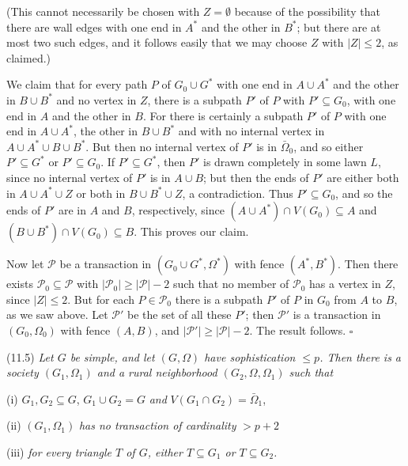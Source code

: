 \noindent (This cannot necessarily be chosen with $Z = \emptyset$ because of the possibility that there are wall edges with one end in $A^*$ and the other in $B^*$; but there are at most two such edges, and it follows easily that we may choose $Z$ with $|Z| \le 2$, as claimed.)

We claim that for every path $P$ of $G_0 \cup G^*$ with one end in $A \cup A^*$ and the other in $B \cup B^*$ and no vertex in $Z$, there is a subpath $P'$ of $P$ with $P' \subseteq G_0$, with one end in $A$ and the other in $B$. For there is certainly a subpath $P'$ of $P$ with one end in $A \cup A^*$, the other in $B \cup B^*$ and with no internal vertex in $A \cup A^* \cup B \cup B^*$. But then no internal vertex of $P'$ is in $\bar{\Omega}_0$, and so either $P' \subseteq G^*$ or $P' \subseteq G_0$. If $P' \subseteq G^*$, then $P'$ is drawn completely in some lawn $L$, since no internal vertex of $P'$ is in $A \cup B$; but then the ends of $P'$ are either both in $A \cup A^* \cup Z$ or both in $B \cup B^* \cup Z$, a contradiction. Thus $P' \subseteq G_0$, and so the ends of $P'$ are in $A$ and $B$, respectively, since $(A \cup A^*) \cap V(G_0) \subseteq A$ and $(B \cup B^*) \cap V(G_0) \subseteq B$. This proves our claim.

Now let $\mathcal{P}$ be a transaction in $(G_0 \cup G^*, \Omega^*)$ with fence $(A^*, B^*)$. Then there exists $\mathcal{P}_0 \subseteq \mathcal{P}$ with $|\mathcal{P}_0| \ge |\mathcal{P}| - 2$ such that no member of $\mathcal{P}_0$ has a vertex in $Z$, since $|Z| \le 2$. But for each $P \in \mathcal{P}_0$ there is a subpath $P'$ of $P$ in $G_0$ from $A$ to $B$, as we saw above. Let $\mathcal{P}'$ be the set of all these $P'$; then $\mathcal{P}'$ is a transaction in $(G_0, \Omega_0)$ with fence $(A, B)$, and $|\mathcal{P}'| \ge |\mathcal{P}| - 2$. The result follows. $\square$

\stmt
(11.5) \textit{Let $G$ be simple, and let $(G, \Omega)$ have sophistication $\le p$. Then there is a society $(G_1, \Omega_1)$ and a rural neighborhood $(G_2, \Omega, \Omega_1)$ such that}

\hspace*{12pt}(i) $G_1, G_2 \subseteq G$, $G_1 \cup G_2 = G$ \textit{and} $V(G_1 \cap G_2) = \bar{\Omega}_1$,

\hspace*{12pt}(ii) $(G_1, \Omega_1)$ \textit{has no transaction of cardinality} $> p + 2$

\hspace*{12pt}(iii) \textit{for every triangle $T$ of $G$, either $T \subseteq G_1$ or $T \subseteq G_2$.}

